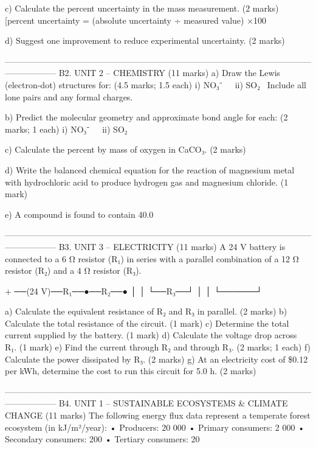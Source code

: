c) Calculate the percent uncertainty in the mass measurement. (2 marks)    
   [percent uncertainty = (absolute uncertainty ÷ measured value) ×100%
  
d) Suggest one improvement to reduce experimental uncertainty. (2 marks)    
  
––––––––––––––––––––––––––––––––––––––––––––––––––––––––––––––––––––––––––––––––––––    
B2. UNIT 2 – CHEMISTRY (11 marks)    
a) Draw the Lewis (electron-dot) structures for: (4.5 marks; 1.5 each)    
   i) NO₃⁻  ii) SO₂     
   Include all lone pairs and any formal charges.    
  
b) Predict the molecular geometry and approximate bond angle for each: (2 marks; 1 each)    
   i) NO₃⁻  ii) SO₂     
  
c) Calculate the percent by mass of oxygen in CaCO₃. (2 marks)    
  
d) Write the balanced chemical equation for the reaction of magnesium metal with hydrochloric acid to produce hydrogen gas and magnesium chloride. (1 mark)    
  
e) A compound is found to contain 40.0%
  
––––––––––––––––––––––––––––––––––––––––––––––––––––––––––––––––––––––––––––––––––––    
B3. UNIT 3 – ELECTRICITY (11 marks)    
A 24 V battery is connected to a 6 Ω resistor (R₁) in series with a parallel combination of a 12 Ω resistor (R₂) and a 4 Ω resistor (R₃).    
  
   + ──(24 V)──R₁──●──R₂──●    
                     │      │    
                     └──R₃──┘    
                     │      │    
                     └──────┘    
  
a) Calculate the equivalent resistance of R₂ and R₃ in parallel. (2 marks)    
b) Calculate the total resistance of the circuit. (1 mark)    
c) Determine the total current supplied by the battery. (1 mark)    
d) Calculate the voltage drop across R₁. (1 mark)    
e) Find the current through R₂ and through R₃. (2 marks; 1 each)    
f) Calculate the power dissipated by R₃. (2 marks)    
g) At an electricity cost of \$0.12 per kWh, determine the cost to run this circuit for 5.0 h. (2 marks)    
  
––––––––––––––––––––––––––––––––––––––––––––––––––––––––––––––––––––––––––––––––––––    
B4. UNIT 1 – SUSTAINABLE ECOSYSTEMS & CLIMATE CHANGE (11 marks)    
The following energy flux data represent a temperate forest ecosystem (in kJ/m²/year):    
  • Producers: 20 000    
  • Primary consumers: 2 000    
  • Secondary consumers: 200    
  • Tertiary consumers: 20    
  
